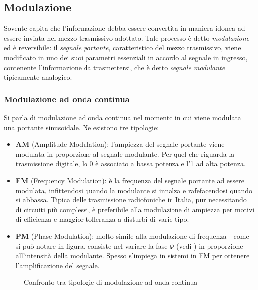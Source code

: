 \documentclass[a4paper,11pt]{article}
\def\sub#1{\subsection{#1}\label{#1}}
\def\subsub#1{\subsubsection{#1}\label{#1}}
\def\vedi#1{\nameref{#1}}
\begin{document}
\sub{Modulazione}
Sovente capita che l'informazione debba essere convertita in maniera idonea ad essere inviata nel mezzo trasmissivo adottato. Tale processo è detto \textit{modulazione} ed è reversibile: il \textit{segnale portante}, caratteristico del mezzo trasmissivo, viene modificato in uno dei suoi parametri essenziali in accordo al segnale in ingresso, contenente l'informazione da trasmettersi, che è detto \textit{segnale modulante} tipicamente analogico.
\subsub{Modulazione ad onda continua}
Si parla di modulazione ad onda continua nel momento in cui viene modulata una portante sinusoidale. Ne esistono tre tipologie:
\begin{itemize}
\item \textbf{AM} (Amplitude Modulation): l'ampiezza del segnale portante viene modulata in proporzione al segnale modulante. Per quel che riguarda la trasmissione digitale, lo 0 è associato a bassa potenza e l'1 ad alta potenza.
\item \textbf{FM} (Frequency Modulation): è la frequenza del segnale portante ad essere modulata, infittendosi quando la modulante si innalza e rafefacendosi quando si abbassa. Tipica delle trasmissione radiofoniche in Italia, pur necessitando di circuiti più complessi, è preferibile alla modulazione di ampiezza per motivi di efficienza e maggior tolleranza a disturbi di vario tipo.
\item \textbf{PM} (Phase Modulation): molto simile alla modulazione di frequenza - come si può notare in figura, consiste nel variare la fase $\Phi $ (vedi \vedi{Segnale}) in proporzione all'intensità della modulante. Spesso s'impiega in sistemi in FM per ottenere l'amplificazione del segnale. 
\end{itemize}
\begin{figure}[h]
\centering
{}
\caption{Confronto tra tipologie di modulazione ad onda continua}\label{fig. 2}
\end{figure}
\end{document}
